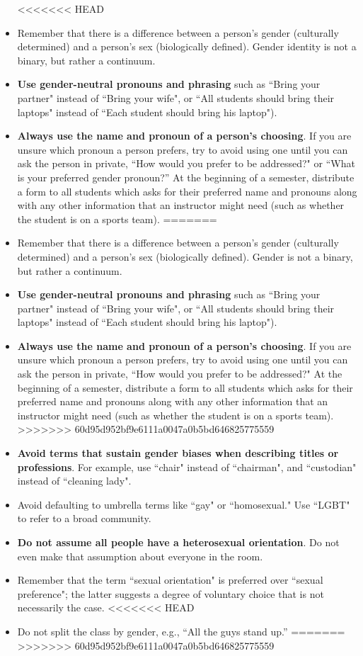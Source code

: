 \begin{itemize}
<<<<<<< HEAD
	\item Remember that there is a difference between a person's gender (culturally determined) and a person's sex (biologically defined). Gender identity is not a binary, but rather a continuum.
	\item \textbf{Use gender-neutral pronouns and phrasing} such as ``Bring your partner" instead of ``Bring your wife", or ``All students should bring their laptops" instead of ``Each student should bring his laptop").
	\item \textbf{Always use the name and pronoun of a person's choosing}. If you are unsure which pronoun a person prefers, try to avoid using one until you can ask the person in private, ``How would you prefer to be addressed?" or ``What is your preferred gender pronoun?''  At the beginning of a semester, distribute a form to all students which asks for their preferred name and pronouns along with any other information that an instructor might need (such as whether the student is on a sports team).
=======
	\item Remember that there is a difference between a person's gender (culturally determined) and a person's sex (biologically defined). Gender is not a binary, but rather a continuum.
	\item \textbf{Use gender-neutral pronouns and phrasing} such as ``Bring your partner" instead of ``Bring your wife", or ``All students should bring their laptops" instead of ``Each student should bring his laptop").
	\item \textbf{Always use the name and pronoun of a person's choosing}. If you are unsure which pronoun a person prefers, try to avoid using one until you can ask the person in private, ``How would you prefer to be addressed?" At the beginning of a semester, distribute a form to all students which asks for their preferred name and pronouns along with any other information that an instructor might need (such as whether the student is on a sports team).
>>>>>>> 60d95d952bf9e6111a0047a0b5bd646825775559
	\item \textbf{Avoid terms that sustain gender biases when describing titles or professions}. For example, use ``chair" instead of ``chairman", and ``custodian" instead of ``cleaning lady".
	\item Avoid defaulting to umbrella terms like ``gay" or ``homosexual." Use ``LGBT" to refer to a broad community.
	\item \textbf{Do not assume all people have a heterosexual orientation}.  Do not even make that assumption about everyone in the room.
	\item Remember that the term ``sexual orientation" is preferred over ``sexual preference"; the latter suggests a degree of voluntary choice that is not necessarily the case.
<<<<<<< HEAD
	\item Do not split the class by gender, e.g., ``All the guys stand up.''
=======
>>>>>>> 60d95d952bf9e6111a0047a0b5bd646825775559
\end{itemize}


